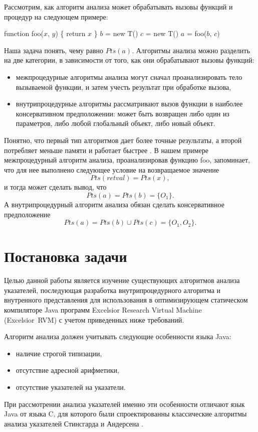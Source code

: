 \documentclass[14pt,titlepage]{extarticle}
\newcommand{\eng}[1]{{\English#1}}
\begin{document}
    Рассмотрим, как алгоритм анализа может обрабатывать вызовы
    функций и процедур на следующем примере:
    \begin{algorithmic}[1]
    \STATE function foo($x$, $y$) \{ return $x$ \}
    \STATE $b$ = new T()
    \STATE $c$ = new T()
    \STATE $a$ = foo($b$, $c$)
    \end{algorithmic}
    Наша задача понять, чему равно $Pts(a)$.
    Алгоритмы анализа можно разделить на две категории, в зависимости от того,
    как они обрабатывают вызовы функций:
    \begin{itemize}
      \item межпроцедурные алгоритмы анализа могут сначал проанализировать
            тело вызываемой функции, и затем учесть результат при обработке
            вызова,
      \item внутрипроцедурные алгоритмы рассматривают вызов функции в наиболее
            консервативном предположении: может быть возвращен либо один из
            параметров, либо любой глобальный объект, либо новый объект.
    \end{itemize}
    Понятно, что первый тип алгоритмов дает более точные результаты,
    а второй потребляет меньше памяти и работает быстрее
    \cite[с.~117]{andersen}.
    В нашем примере межпроцедурный алгоритм анализа, проанализировав функцию
    foo, запоминает, что для нее выполнено следующее условие на возвращаемое
    значение
    \[Pts(retval) = Pts(x),\]
    и тогда может сделать вывод, что \[Pts(a) = Pts(b) = \{O_1\}.\]
    А внутрипроцедурный алгоритм анализа обязан сделать консервативное
    предположение \[Pts(a) = Pts(b) \cup Pts(c) = \{O_1, O_2\}.\]


  \newpage
  \section{Постановка задачи}

    Целью данной работы является изучение существующих алгоритмов анализа
    указателей, последующая разработка внутрипроцедурного алгоритма и
    внутренного представления для использования в оптимизирующем
    статическом компиляторе Java программ
    \eng{Excelsior Research Virtual Machine (Excelsior~RVM)}
    с учетом приведенных ниже требований.

    Алгоритм анализа должен учитывать следующие особенности языка Java:
    \begin{itemize}
      \item наличие строгой типизации,
      \item отсутствие адресной арифметики,
      \item отсутствие указателей на указатели.
    \end{itemize}
    При рассмотрении анализа указателей
    именно эти особенности отличают язык Java от языка C, для которого были
    спроектированны классические алгоритмы анализа указателей
    Стинсгарда \cite{steensgaard} и Андерсена \cite{andersen}.
\end{document}
